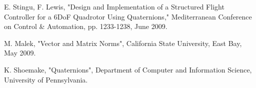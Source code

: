 \documentclass{article}
\numberwithin{equation}{section} %
\begin{document}
\begin{thebibliography}{99}


	E. Stingu, F. Lewis, 
	"Design and Implementation of a Structured Flight Controller for a 6DoF Quadrotor Using Quaternions," 
Mediterranean Conference on Control \& Automation, pp. 1233-1238, June 2009.


	M. Malek,
	"Vector and Matrix Norms", California State University, East Bay, May 2009.
	
	K. Shoemake,
	"Quaternions", Department of Computer and Information Science, University of Pennsylvania.
	
	
	
\end{thebibliography}
\end{document}
